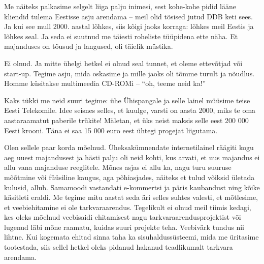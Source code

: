 Me näiteks palkasime selgelt liiga palju inimesi, 
sest kohe-kohe pidid lääne kliendid tulema Eestisse asju arendama -- meil olid 
tõsised jutud DDB keti sees. Ja kui see mull 2000. aastal 
lõhkes, siis 
kõigi jaoks korraga: lõhkes meil Eestis ja lõhkes seal. Ja seda ei suutnud
me täiesti roheliste tüüpidena ette näha. Et majanduses on 
tõusud ja langused, oli täielik müstika. 


Ei olnud. Ja mitte ühelgi hetkel ei olnud seal tunnet, et oleme 
ettevõtjad või start-up. Tegime asju, mida oskasime ja 
mille jaoks oli tõmme turult ja nõudlus. Homme 
küsitakse multimeedia CD-ROMi -- \enquote{oh, teeme neid ka!} 


Kaks tükki me neid suuri tegime: ühe Ühispangale 
ja selle lainel müüsime teise Eesti Telekomile. 
Idee seisnes selles, et kuulge, varsti on aasta 2000, miks te oma 
aastaraamatut paberile trükite! Mäletan, et üks neist 
maksis selle eest 200 000 Eesti krooni. Täna ei saa 15 
000 euro eest ühtegi progejat liigutama.


Olen sellele paar korda mõelnud. Üheksakümnendate internetilainel räägiti kogu aeg uuest majandusest ja hästi palju oli neid kohti, 
kus arvati, et uus majandus ei allu vana majanduse reeglitele. Mõnes asjas ei 
allu ka, nagu turu suuruse mõõtmine või füüsiline kaugus, aga põhiasjades, näiteks et tulud võiksid ületada kulusid, allub. Samamoodi 
vastandati e-kommertsi ja päris kaubandust ning kõike käsitleti 
eraldi. Me tegime mitu aastat seda äri selles suhtes 
valesti, et mõtlesime, et veebiehitamine ei ole tarkvaraarendus. 
Tegelikult ei olnud meil tiimis kedagi, kes oleks mõelnud veebisaidi 
ehitamisest nagu tarkvaraarendusprojektist või lugenud läbi mõne raamatu, kuidas suuri projekte teha. Veebivärk tundus 
nii lihtne. Kui kogemata ehitad sinna taha ka sisuhaldussüsteemi, 
mida me üritasime tootestada, siis sellel hetkel oleks pidanud hakanud teadlikumalt tarkvara arendama. 

